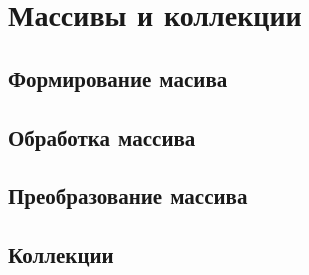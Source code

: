 \section{Массивы и коллекции}

\subsection{Формирование масива}

\subsection{Обработка массива}

\subsection{Преобразование массива}

\subsection{Коллекции}
